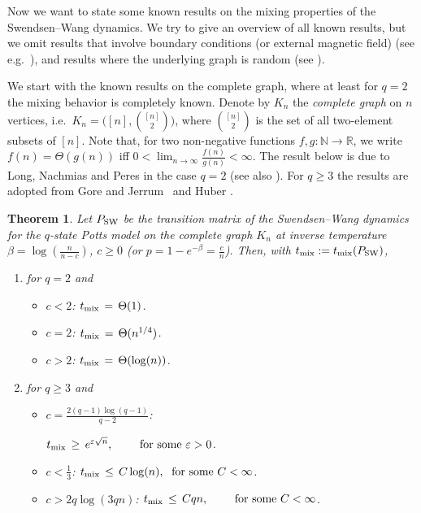 \documentclass{dis}
\newtheorem{theorem}{Theorem}[chapter]
\theoremstyle{citing}
\begin{document}
Now we want to state some 
known results on the mixing properties of the Swendsen--Wang 
dynamics. We try to give an overview of all known results, but 
we omit results that involve boundary conditions 
(or external magnetic field) (see e.g.~\cite{M2,MOScopp1,MOScopp2}), 
and results where the underlying graph is random (see \cite{CF}).

We start with the known results on the complete graph, where 
at least for $q=2$ the mixing behavior is completely known.
Denote by $K_n$ the 
\emph{complete graph} 
on $n$ vertices, 
i.e.~$K_n=\bigl([n],\genfrac(){0pt}{1}{[n]}{2}\bigr)$,
where $\genfrac(){0pt}{1}{[n]}{2}$ is the set of all two-element 
subsets of $[n]$.
Note that, for two non-negative functions $f,g: {\ensuremath{\mathbb{N}}}\to{\ensuremath{\mathbb{R}}}$, we write 
$f(n)=\Theta(g(n))$ iff $0<\lim_{n\to\infty}\frac{f(n)}{g(n)}<\infty$.
The result below is due to Long, Nachmias and Peres \cite{LNP,Long} 
in the case $q=2$ (see also \cite{CDFR}). For $q\ge3$ the results are 
adopted from Gore and Jerrum~\cite{GJ} and Huber \cite{Hu}.

\vspace{1mm}
\begin{theorem} \label{th:SW_complete}
Let ${P_{\rm SW}}$ be the transition matrix of the Swendsen--Wang dynamics for 
the $q$-state Potts model on the complete graph $K_n$ at inverse 
temperature $\beta=\log(\frac{n}{n-c})$, $c\ge0$ 
(or $p=1-e^{-\beta}=\frac{c}{n}$).
Then, with $t_{\rm mix}:=t_{\rm mix}({P_{\rm SW}})$, 
\begin{enumerate}
	\item[$(i)$] for $q=2$ and 
		\vspace*{-1mm}
		\begin{itemize}
			\item $c<2$:\; $t_{\rm mix} \,=\, \Theta(1)$. \vspace{1mm}
			\item $c=2$:\; $t_{\rm mix}\,=\, \Theta(n^{1/4})$. \vspace{1mm}
			\item $c>2$:\; $t_{\rm mix} \,=\, \Theta(\log(n))$.
		\end{itemize}
	\item[$(ii)$] for $q\ge3$ and 
		\vspace*{-1mm}
		\begin{itemize}
			\item $c=\frac{2(q-1)\log(q-1)}{q-2}$:\;\; 
					 
					$t_{\rm mix} \,\ge\, e^{{\varepsilon} \sqrt{n}}, \qquad
						\text{ for some } {\varepsilon}>0$. \vspace{2mm}
			\item \quad $c<\frac13$:\qquad\qquad\quad
					$t_{\rm mix}\,\le\, C \log(n), \;
						\text{ for some } C<\infty$. 
			\item \;\;$c>2q\log(3q n)$:\quad\quad 
					$t_{\rm mix} \,\le\, C q  n, \qquad
						\text{ for some } C<\infty$.
		\end{itemize}
\end{enumerate}
\end{theorem}
\end{document}
